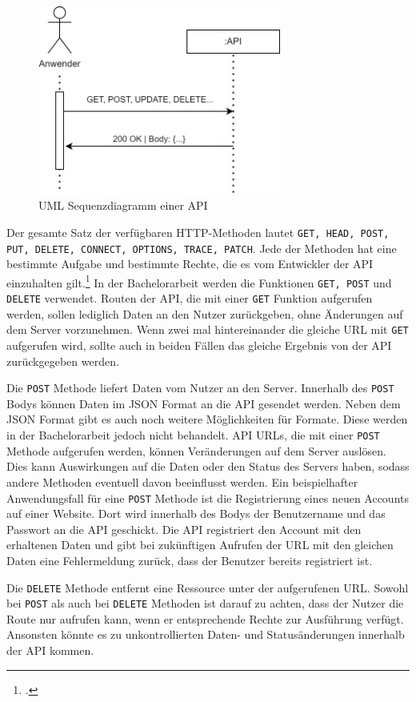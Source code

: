 \begin{figure}[H]
  \centering
    \includegraphics[width = 8cm]{bilder/APISequenzdiagramm}
    \caption{UML Sequenzdiagramm einer API}
\end{figure}

Der gesamte Satz der verfügbaren HTTP-Methoden lautet \texttt{GET, HEAD, POST, PUT, DELETE, CONNECT, OPTIONS, TRACE, PATCH}. Jede der Methoden hat eine bestimmte Aufgabe und bestimmte Rechte, die es vom Entwickler der API einzuhalten gilt.\footcite{mdn2022http} In der Bachelorarbeit werden die Funktionen \texttt{GET, POST} und \texttt{DELETE} verwendet. Routen der API, die mit einer \texttt{GET} Funktion aufgerufen werden, sollen lediglich Daten an den Nutzer zurückgeben, ohne Änderungen auf dem Server vorzunehmen. Wenn zwei mal hintereinander die gleiche URL mit \texttt{GET} aufgerufen wird, sollte auch in beiden Fällen das gleiche Ergebnis von der API zurückgegeben werden.

Die \texttt{POST} Methode liefert Daten vom Nutzer an den Server. Innerhalb des \texttt{POST} Bodys können Daten im JSON Format an die API gesendet werden. Neben dem JSON Format gibt es auch noch weitere Möglichkeiten für Formate. Diese werden in der Bachelorarbeit jedoch nicht behandelt. API URLs, die mit einer \texttt{POST} Methode aufgerufen werden, können Veränderungen auf dem Server auslösen. Dies kann Auswirkungen auf die Daten oder den Status des Servers haben, sodass andere Methoden eventuell davon beeinflusst werden. Ein beispielhafter Anwendungsfall für eine \texttt{POST} Methode ist die Registrierung eines neuen Accounts auf einer Website. Dort wird innerhalb des Bodys der Benutzername und das Passwort an die API geschickt. Die API registriert den Account mit den erhaltenen Daten und gibt bei zukünftigen Aufrufen der URL mit den gleichen Daten eine Fehlermeldung zurück, dass der Benutzer bereits registriert ist.

Die \texttt{DELETE} Methode entfernt eine Ressource unter der aufgerufenen URL. Sowohl bei \texttt{POST} als auch bei \texttt{DELETE} Methoden ist darauf zu achten, dass der Nutzer die Route nur aufrufen kann, wenn er entsprechende Rechte zur Ausführung verfügt. Ansonsten könnte es zu unkontrollierten Daten- und Statusänderungen innerhalb der API kommen. 

